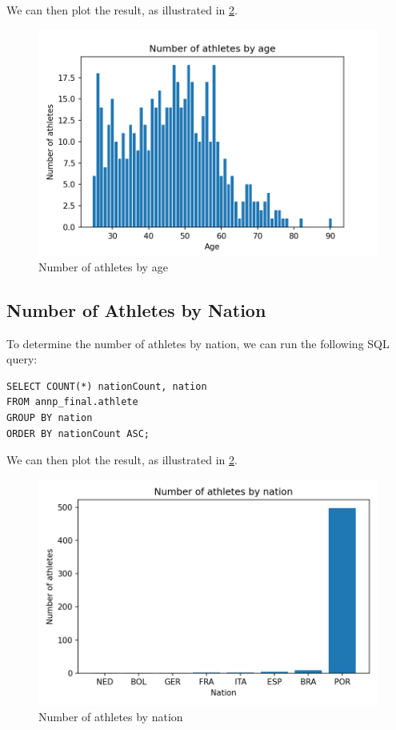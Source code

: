 We can then plot the result, as illustrated in \cref{fig:athletesbynation}.

\begin{figure}[H]
    \centering
    \includegraphics[width=\textwidth]{img/athletesbyage}
    \caption{Number of athletes by age}
    \label{fig:athletesbyage}
\end{figure}

\subsection{Number of Athletes by Nation}\label{subsec:number-of-athletes-by-nation}

To determine the number of athletes by nation, we can run the following SQL query:

\begin{verbatim}
SELECT COUNT(*) nationCount, nation
FROM annp_final.athlete
GROUP BY nation
ORDER BY nationCount ASC;
\end{verbatim}

We can then plot the result, as illustrated in \cref{fig:athletesbynation}.

\begin{figure}[H]
    \centering
    \includegraphics[width=.8\textwidth]{img/athletesbynation}
    \caption{Number of athletes by nation}
    \label{fig:athletesbynation}
\end{figure}

